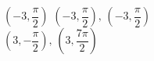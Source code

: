 { $\left( -3, \dfrac{\pi}{2} \right)$ }
{$\left( -3, \dfrac{\pi}{2} \right), \, \left( -3, \dfrac{\pi}{2} \right)$\\$\left( 3, -\dfrac{\pi}{2} \right), \, \left( 3, \dfrac{7\pi}{2} \right)$\\ }
